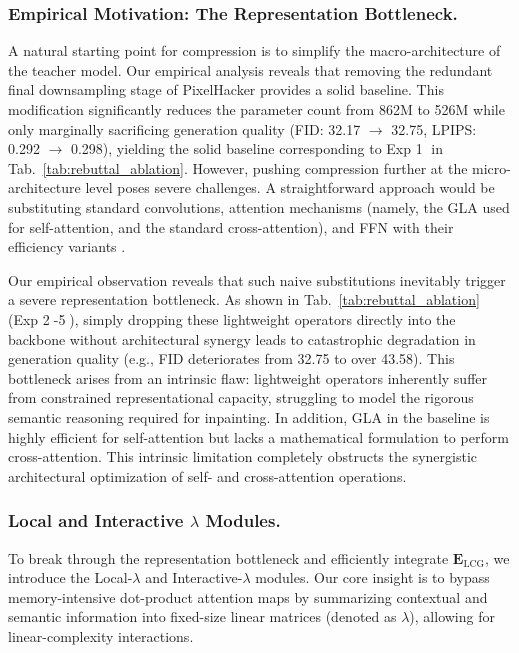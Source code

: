 \documentclass[runningheads]{llncs}
\begin{document}
\subsubsection{Empirical Motivation: The Representation Bottleneck.}\label{sec:motivation}
A natural starting point for compression is to simplify the macro-architecture of the teacher model. Our empirical analysis reveals that removing the redundant final downsampling stage of PixelHacker provides a solid baseline. This modification significantly reduces the parameter count from 862M to 526M while only marginally sacrificing generation quality (FID: 32.17 $\rightarrow$ 32.75, LPIPS: 0.292 $\rightarrow$ 0.298), yielding the solid baseline corresponding to Exp \textcircled{\small 1} in Tab.~\ref{tab:rebuttal_ablation}. However, pushing compression further at the micro-architecture level poses severe challenges. A straightforward approach would be substituting standard convolutions, attention mechanisms (namely, the GLA \cite{yang2024gla} used for self-attention, and the standard cross-attention), and FFN with their efficiency variants \cite{Sandler2018MobileNetV2, xie2024sana, xie2021segformer}.

Our empirical observation reveals that such naive substitutions inevitably trigger a severe representation bottleneck. As shown in Tab.~\ref{tab:rebuttal_ablation} (Exp \textcircled{\small 2}-\textcircled{\small 5}), simply dropping these lightweight operators directly into the backbone without architectural synergy leads to catastrophic degradation in generation quality (e.g., FID deteriorates from 32.75 to over 43.58). This bottleneck arises from an intrinsic flaw: lightweight operators inherently suffer from constrained representational capacity, struggling to model the rigorous semantic reasoning required for inpainting. In addition, GLA \cite{yang2024gla} in the baseline is highly efficient for self-attention but lacks a mathematical formulation to perform cross-attention. This intrinsic limitation completely obstructs the synergistic architectural optimization of self- and cross-attention operations.


\vspace{-1.6em}
\subsubsection{Local and Interactive $\lambda$ Modules.}\label{sec:lambda_modules}
To break through the representation bottleneck and efficiently integrate $\mathbf{E}_\text{LCG}$, we introduce the Local-$\lambda$ and Interactive-$\lambda$ modules. Our core insight is to bypass memory-intensive dot-product attention maps by summarizing contextual and semantic information into fixed-size linear matrices (denoted as $\lambda$), allowing for linear-complexity interactions.
\end{document}
